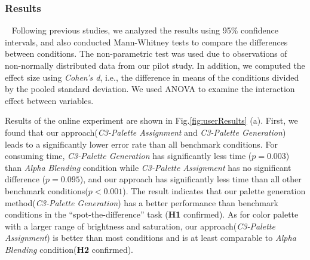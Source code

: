\subsubsection{Results}
\
\newline
Following previous studies, we analyzed the results using 95\% confidence intervals, and also conducted Mann-Whitney tests to compare the differences between conditions. The non-parametric test was used due to observations of non-normally distributed data from our pilot study. In addition, we computed the effect size using \emph{Cohen's d}, i.e., the difference in means of the conditions divided by the pooled standard deviation. We used ANOVA to examine the interaction effect between variables.


Results of the online experiment are shown in Fig.\ref{fig:userResults} (a).
First, we found that our approach(\emph{C3-Palette Assignment} and \emph{C3-Palette Generation}) leads to a significantly lower error rate than all benchmark conditions. For consuming time, \emph{C3-Palette Generation} has significantly less time (\emph{$p = 0.003$}) than \emph{Alpha Blending} condition while \emph{C3-Palette Assignment} has no significant difference (\emph{$p = 0.095$}), and our approach has significantly less time than all other benchmark conditions(\emph{$p < 0.001$}). The result indicates that our palette generation method(\emph{C3-Palette Generation}) has a better performance than benchmark conditions in the ``spot-the-difference'' task (\textbf{H1} confirmed). As for color palette with a larger range of brightness and saturation, our approach(\emph{C3-Palette Assignment}) is better than most conditions and is at least comparable to \emph{Alpha Blending} condition(\textbf{H2} confirmed).


